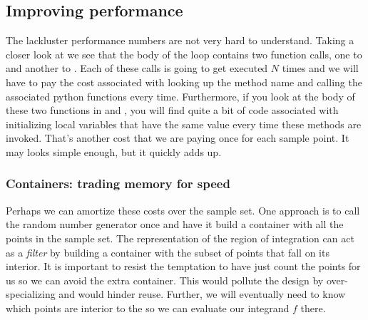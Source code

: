 
\subsection{Improving performance}
\label{sec:classes:improved-performane}

The lackluster performance numbers are not very hard to understand. Taking a closer look at
 we see that the body of the loop contains two function calls, one to
 and another to . Each of these calls is going to get
executed $N$ times and we will have to pay the cost associated with looking up the method name
and calling the associated python functions every time. Furthermore, if you look at the body of
these two functions in  and , you will find quite a bit
of code associated with initializing local variables that have the same value every time these
methods are invoked. That's another cost that we are paying once for each sample point. It
may looks simple enough, but it quickly adds up.

\subsubsection{Containers: trading memory for speed}
\label{sec:classes:containers}

Perhaps we can amortize these costs over the sample set. One approach is to call the random
number generator once and have it build a container with all the points in the sample set. The
representation of the region of integration can act as a {\em filter} by building a container
with the subset of points that fall on its interior. It is important to resist the temptation
to have  just count the points for us so we can avoid the extra container. This
would pollute the design by over-specializing  and would hinder reuse. Further, we
will eventually need to know which points are interior to the  so we can evaluate
our integrand $f$ there.

